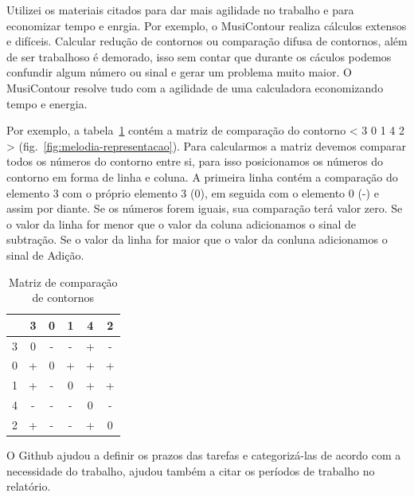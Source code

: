\documentclass[11pt]{article}
\begin{document}
Utilizei os materiais citados para dar mais agilidade no trabalho e para
economizar tempo e enrgia.
Por exemplo, o MusiContour realiza cálculos extensos e difíceis. Calcular
redução de contornos ou comparação difusa de contornos, além de ser trabalhoso
é demorado, isso sem contar que durante os cáculos podemos
confundir algum número ou sinal e gerar um problema muito maior. O
MusiContour resolve tudo com a agilidade de uma calculadora
economizando tempo e energia.

Por exemplo, a tabela~\ref{tab:matriz-comparacao-contornos} contém a
matriz de comparação do contorno < 3 0 1 4 2 >
(fig.~\ref{fig:melodia-representacao}). Para calcularmos a matriz
devemos comparar todos os números do contorno entre si, para isso
posicionamos os números do contorno em forma de linha e coluna.
A primeira linha contém a comparação do elemento 3 com o próprio elemento 3 (0),
em seguida com o elemento 0 (-) e assim por diante. Se os números forem iguais,
sua comparação terá valor zero. Se o valor da linha for menor que o valor da
coluna adicionamos o sinal de subtração. Se o valor da linha for maior
que o valor da conluna adicionamos o sinal de Adição.

\begin{table}
  \centering
  \begin{tabular}{c|ccccc}
    &3&0&1&4&2\\
    \hline
    3&0&-&-&+&-\\
    0&+&0&+&+&+\\
    1&+&-&0&+&+\\
    4&-&-&-&0&-\\
    2&+&-&-&+&0\\
  \end{tabular}
  \caption{Matriz de comparação de contornos}
  \label{tab:matriz-comparacao-contornos}
\end{table}

O Github ajudou a definir os prazos das tarefas e categorizá-las de acordo 
com a necessidade do trabalho, ajudou também a citar os períodos de trabalho
no relatório.
\end{document}
